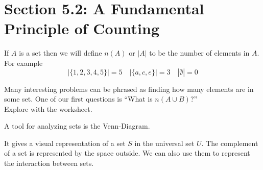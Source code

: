 \documentclass[14,fleqn]{article}
\begin{document}
\section{Section 5.2: A Fundamental Principle of Counting}
If $A$ is a set then we will define $n(A)$ or $|A|$ to be the number of elements in $A.$ For example
\[
	|\{1,2,3,4,5\}|=5\quad |\{a,c,e\}|=3 \quad |\emptyset|=0
\]

Many interesting problems can be phrased as finding how many elements are in some set. One of our first questions is ``What is $n(A\cup B)$?''\\
Explore with the worksheet.

A tool for analyzing sets is the Venn-Diagram.\\
\begin{center}
\end{center}

It gives a visual representation of a set $S$ in the universal set $U.$ The complement of a set is represented by the space outside. We can also use them to represent the interaction between sets.
\begin{center}
\end{center}
\end{document}
